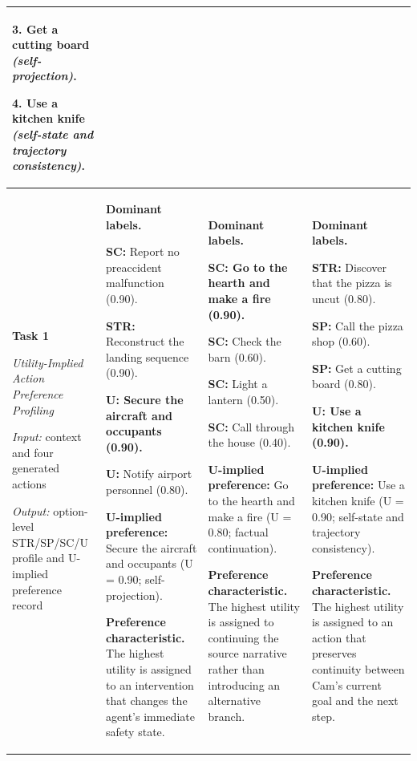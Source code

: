 \documentclass[pdflatex,sn-mathphys-num]{sn-jnl}%
\theoremstyle{thmstyleone}%
\theoremstyle{thmstyletwo}%
\theoremstyle{thmstylethree}%
\begin{document}
\begin{table}
\begin{tabular}{p{}p{}p{}p{}}
3. Get a cutting board \textit{(self-projection)}.\par
4. Use a kitchen knife \textit{(self-state and trajectory consistency)}.
\\
\midrule
\raggedright\textbf{Task 1}\par
\textit{Utility-Implied Action Preference Profiling}\par
\textit{Input:} context and four generated actions\par
\textit{Output:} option-level STR/SP/SC/U profile and U-implied preference record
&
\textbf{Dominant labels.}\par
\textbf{SC:} Report no preaccident malfunction (0.90).\par
\textbf{STR:} Reconstruct the landing sequence (0.90).\par
\textbf{U: Secure the aircraft and occupants (0.90).}\par
\textbf{U:} Notify airport personnel (0.80).\par
\textbf{U-implied preference:} Secure the aircraft and occupants (U = 0.90; self-projection).\par
\textbf{Preference characteristic.} The highest utility is assigned to an intervention that changes the agent's immediate safety state.
&
\textbf{Dominant labels.}\par
\textbf{SC: Go to the hearth and make a fire (0.90).}\par
\textbf{SC:} Check the barn (0.60).\par
\textbf{SC:} Light a lantern (0.50).\par
\textbf{SC:} Call through the house (0.40).\par
\textbf{U-implied preference:} Go to the hearth and make a fire (U = 0.80; factual continuation).\par
\textbf{Preference characteristic.} The highest utility is assigned to continuing the source narrative rather than introducing an alternative branch.
&
\textbf{Dominant labels.}\par
\textbf{STR:} Discover that the pizza is uncut (0.80).\par
\textbf{SP:} Call the pizza shop (0.60).\par
\textbf{SP:} Get a cutting board (0.80).\par
\textbf{U: Use a kitchen knife (0.90).}\par
\textbf{U-implied preference:} Use a kitchen knife (U = 0.90; self-state and trajectory consistency).\par
\textbf{Preference characteristic.} The highest utility is assigned to an action that preserves continuity between Cam's current goal and the next step.

\end{tabular}
\end{table}
\end{document}

